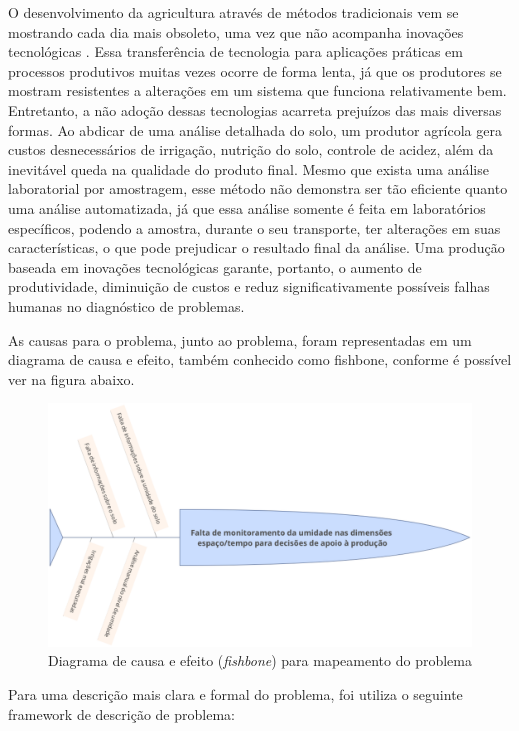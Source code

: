   O desenvolvimento da agricultura através de métodos tradicionais vem se
  mostrando cada dia mais obsoleto, uma vez que não acompanha inovações
  tecnológicas \cite{ROCHA2015}. Essa transferência de tecnologia para aplicações
  práticas em processos produtivos muitas vezes ocorre de forma lenta, já que
  os produtores se mostram resistentes a alterações em um sistema que funciona
  relativamente bem. Entretanto, a não adoção dessas tecnologias acarreta
  prejuízos das mais diversas formas. Ao abdicar de uma análise detalhada do
  solo, um produtor agrícola gera custos desnecessários de irrigação, nutrição
  do solo, controle de acidez, além da inevitável queda na qualidade do produto
  final. Mesmo que exista uma análise laboratorial por amostragem, esse método
  não demonstra ser tão eficiente quanto uma análise automatizada, já que essa
  análise somente é feita em laboratórios específicos, podendo a amostra,
  durante o seu transporte, ter alterações em suas características, o que pode
  prejudicar o resultado final da análise. Uma produção baseada em inovações
  tecnológicas garante, portanto, o aumento de produtividade, diminuição de
  custos e reduz significativamente possíveis falhas humanas no diagnóstico de
  problemas.


  As causas para o problema, junto ao problema, foram representadas em um diagrama
  de causa e efeito, também conhecido como fishbone, conforme é possível ver
  na figura abaixo.

  \begin{figure}[h]
    \centering
    \label{fig01}
      \includegraphics[keepaspectratio=true,scale=0.5]{figuras/fig01.eps}
    \caption{Diagrama de causa e efeito (\textit{fishbone}) para mapeamento do problema}
  \end{figure}

  Para uma descrição mais clara e formal do problema, foi utiliza o seguinte
  framework de descrição de problema:

